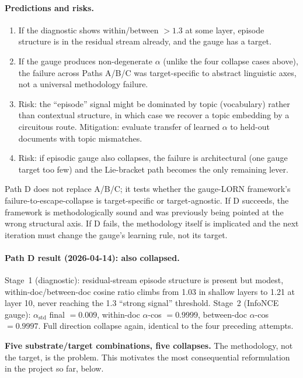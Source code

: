 \documentclass[11pt, a4paper]{article}
\theoremstyle{plain}
\theoremstyle{definition}
\theoremstyle{remark}
\begin{document}
\paragraph{Predictions and risks.}
\begin{enumerate}[nosep,leftmargin=2em]
\item If the diagnostic shows within/between $> 1.3$ at some layer, episode structure is in the residual stream already, and the gauge has a target.
\item If the gauge produces non-degenerate $\alpha$ (unlike the four collapse cases above), the failure across Paths A/B/C was target-specific to abstract linguistic axes, not a universal methodology failure.
\item Risk: the ``episode'' signal might be dominated by topic (vocabulary) rather than contextual structure, in which case we recover a topic embedding by a circuitous route. Mitigation: evaluate transfer of learned $\alpha$ to held-out documents with topic mismatches.
\item Risk: if episodic gauge also collapses, the failure is architectural (one gauge target too few) and the Lie-bracket path becomes the only remaining lever.
\end{enumerate}

Path D does not replace A/B/C; it tests whether the gauge-LORN framework's failure-to-escape-collapse is target-specific or target-agnostic.
If D succeeds, the framework is methodologically sound and was previously being pointed at the wrong structural axis.
If D fails, the methodology itself is implicated and the next iteration must change the gauge's learning rule, not its target.

\paragraph{Path D result (2026-04-14): also collapsed.}
Stage~1 (diagnostic): residual-stream episode structure is present but modest, within-doc/between-doc cosine ratio climbs from 1.03 in shallow layers to 1.21 at layer 10, never reaching the 1.3 ``strong signal'' threshold.
Stage~2 (InfoNCE gauge): $\alpha_{\mathrm{std}}$ final $= 0.009$, within-doc $\alpha$-cos $= 0.9999$, between-doc $\alpha$-cos $= 0.9997$.
Full direction collapse again, identical to the four preceding attempts.

\textbf{Five substrate/target combinations, five collapses.}
The methodology, not the target, is the problem.
This motivates the most consequential reformulation in the project so far, below.
\end{document}
